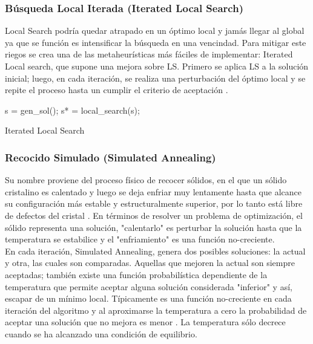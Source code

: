 \documentclass{ci5652}
\begin{document}

\subsubsection{Búsqueda Local Iterada (Iterated Local Search)}

Local Search podría quedar atrapado en un óptimo local y jamás llegar al global
ya que se función es intensificar la búsqueda en una vencindad. Para mitigar
este riegos se crea una de las metaheurísticas más fáciles de implementar:
Iterated Local search, que supone una mejora sobre LS. Primero se aplica LS a la
solución inicial; luego, en cada iteración, se realiza una perturbación del
óptimo local y se repite el proceso hasta un cumplir el criterio de aceptación
\cite{Talbi_2009}.\\

\begin{algorithm}
 \DontPrintSemicolon
 \vspace*{0.1cm}
  s = gen\_sol();\;
  s* = local\_search(s);\;
 \vspace*{0.1cm}
 \caption{Iterated Local Search}
\end{algorithm}



\subsubsection{Recocido Simulado (Simulated Annealing)}

Su nombre proviene del proceso físico de recocer sólidos, en el que un sólido
cristalino es calentado y luego se deja enfriar muy lentamente hasta que alcance
su configuración más estable y estructuralmente superior, por lo tanto está
libre de defectos del cristal \cite{Glover_2003}. En términos de resolver un
problema de optimización, el sólido representa una solución, "calentarlo" es
perturbar la solución hasta que la temperatura se estabilice y el "enfriamiento"
es una función no-creciente.\\

En cada iteración, Simulated Annealing, genera dos posibles soluciones: la
actual y otra, las cuales son comparadas. Aquellas que mejoren la actual
son siempre aceptadas; también existe una función probabilística dependiente de
la temperatura que permite aceptar alguna solución considerada "inferior" y así,
escapar de un mínimo local. Típicamente es una función no-creciente en cada
iteración del algoritmo y al aproximarse la temperatura a cero la probabilidad
de aceptar una solución que no mejora es menor \cite{Glover_2003}. La
temperatura sólo decrece cuando se ha alcanzado una condición de equilibrio.\\
\end{document}
